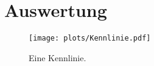 \section{Auswertung}
\label{sec:Auswertung}
\begin{figure}
    \centering
    \texttt{[image: plots/Kennlinie.pdf]}
    \caption{Eine Kennlinie.}
    \label{fig:Kennlinie}
\end{figure}